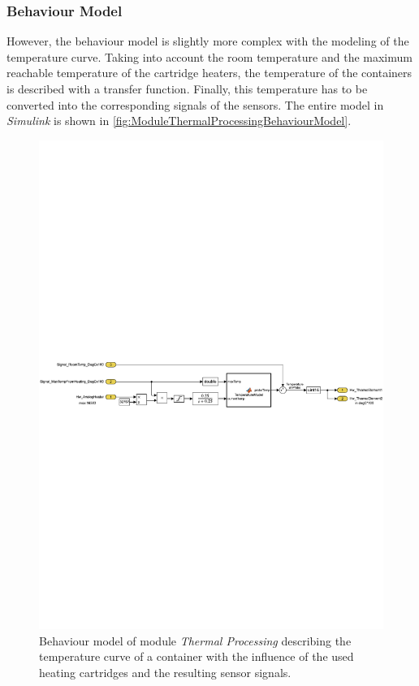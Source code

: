     \subsubsection{Behaviour Model}
    However, the behaviour model is slightly more complex with the modeling of the temperature curve. Taking into account the room temperature and the maximum reachable temperature of the cartridge heaters, the temperature of the containers is described with a transfer function. Finally, this temperature has to be converted into the corresponding signals of the sensors. The entire model in \textit{Simulink} is shown in \autoref{fig:ModuleThermalProcessingBehaviourModel}.
	\begin{figure}[htp]
		\centering
		\includegraphics[trim=0mm 93mm 0mm 93mm, clip, width=0.95\linewidth]{figures/BehaviourModelThermalProcessing.pdf}
		\caption[Behaviour model of module \textit{Thermal Processing}.] {Behaviour model of module \textit{Thermal Processing} describing the temperature curve of a container with the influence of the used heating cartridges and the resulting sensor signals.}
		\label{fig:ModuleThermalProcessingBehaviourModel}
	\end{figure}
	
